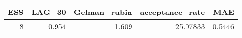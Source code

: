 \begin{longtable}{rrrrr}
\toprule
ESS & LAG\_30 & Gelman\_rubin & acceptance\_rate & MAE \\ 
\midrule
8 & 0.954 & 1.609 & 25.07833 & 0.5446 \\ 
\bottomrule
\end{longtable}

